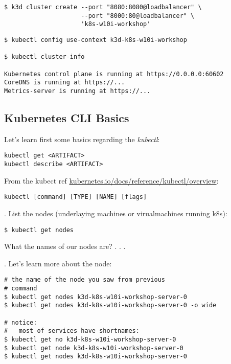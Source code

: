\documentclass[12pt, letterpaper]{article}
\begin{document}
\begin{verbatim}
$ k3d cluster create --port "8080:8080@loadbalancer" \
                     --port "8000:80@loadbalancer" \
                     'k8s-w10i-workshop'
\end{verbatim}

\begin{verbatim}
$ kubectl config use-context k3d-k8s-w10i-workshop

$ kubectl cluster-info

Kubernetes control plane is running at https://0.0.0.0:60602
CoreDNS is running at https://...
Metrics-server is running at https://...
\end{verbatim}

\subsection{Kubernetes {\small CLI} Basics}

Let's learn first some basics regarding the \textit{kubectl}:

\begin{verbatim}
kubectl get <ARTIFACT>
kubectl describe <ARTIFACT>
\end{verbatim}

From the kubect ref
\href{https://kubernetes.io/docs/reference/kubectl/overview/}{kubernetes.io/docs/reference/kubectl/overview}:

\begin{verbatim}
kubectl [command] [TYPE] [NAME] [flags]
\end{verbatim}

. List the nodes (underlaying machines or virualmachines running k8s):

\begin{verbatim}
$ kubectl get nodes
\end{verbatim}

What the names of our nodes are? . . .

. Let's learn more about the node:

\begin{verbatim}
# the name of the node you saw from previous
# command
$ kubectl get nodes k3d-k8s-w10i-workshop-server-0
$ kubectl get nodes k3d-k8s-w10i-workshop-server-0 -o wide

# notice:
#   most of services have shortnames:
$ kubectl get no k3d-k8s-w10i-workshop-server-0
$ kubectl get node k3d-k8s-w10i-workshop-server-0
$ kubectl get nodes k3d-k8s-w10i-workshop-server-0
\end{verbatim}
\end{document}
